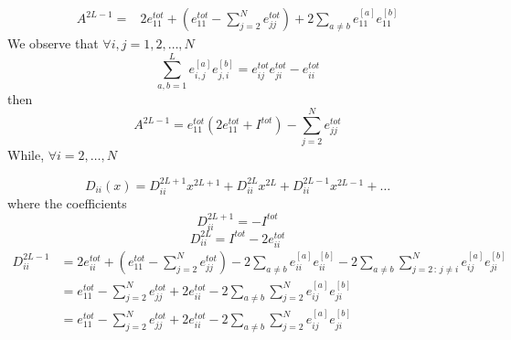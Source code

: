\documentclass[11pt]{article}
\numberwithin{equation}{section}
\numberwithin{equation}{subsection}
\begin{document}
\begin{equation}
	\begin{split}
		A^{2L-1}=&2e_{11}^{tot}+\left(e_{11}^{tot}-\sum_{j=2}^{N}e_{jj}^{tot}\right)+2\sum_{a\neq b}e_{11}^{[a]}e_{11}^{[b]}
	\end{split}
\end{equation}
We observe that $\forall i,j=1,2,\ldots,N$
\begin{equation}
	\sum_{a,b=1}^{L}e_{i,j}^{[a]}e_{j,i}^{[b]}=e_{ij}^{tot}e_{ji}^{tot}-e_{ii}^{tot}
\end{equation}
then 
\begin{equation}
	\boxed{A^{2L-1}=e_{11}^{tot}\left(2e_{11}^{tot}+I^{tot}\right)-\sum_{j=2}^{N}e_{jj}^{tot}}
\end{equation}
While, $\forall i=2,\ldots,N$


\begin{equation}
	D_{ii}(x)=D_{ii}^{2L+1}x^{2L+1}+D_{ii}^{2L}x^{2L}+D_{ii}^{2L-1}x^{2L-1}+\ldots
\end{equation}
where the coefficients
\begin{equation}\label{a2lp}
	D_{ii}^{2L+1}=-I^{tot}
\end{equation}\begin{equation}\label{a2l}
	D_{ii}^{2L}=I^{tot}-2e_{ii}^{tot}
\end{equation}
\begin{equation}\label{a2lm1}
	\begin{split}
		D_{ii}^{2L-1}&=2e_{ii}^{tot}+\left(e_{11}^{tot}-\sum_{j=2}^{N}e_{jj}^{tot}\right)-2\sum_{a\neq b}e_{ii}^{[a]}e_{ii}^{[b]}-2\sum_{a\neq b}\sum_{j=2\,:\,j\neq i}^{N}e_{ij}^{[a]}e_{ji}^{[b]}\\
		&=e_{11}^{tot}-\sum_{j=2}^{N}e_{jj}^{tot}+2e_{ii}^{tot}-2\sum_{a\neq b}\sum_{j=2}^{N}e_{ij}^{[a]}e_{ji}^{[b]}\\
		&=e_{11}^{tot}-\sum_{j=2}^{N}e_{jj}^{tot}+2e_{ii}^{tot}-2\sum_{a\neq b}\sum_{j=2}^{N}e_{ij}^{[a]}e_{ji}^{[b]}\\ 
	\end{split}
\end{equation}
\end{document}
